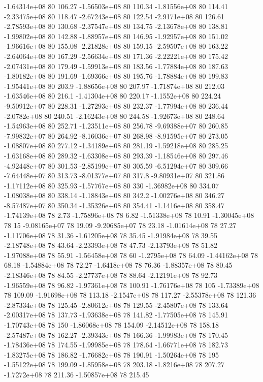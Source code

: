 -1.64314e+08 80 106.27
-1.56503e+08 80 110.34
-1.81556e+08 80 114.41
-2.33475e+08 80 118.47
-2.67243e+08 80 122.54
-2.9171e+08 80 126.61
-2.78593e+08 80 130.68
-2.37547e+08 80 134.75
-2.13678e+08 80 138.81
-1.99802e+08 80 142.88
-1.88957e+08 80 146.95
-1.92957e+08 80 151.02
-1.96616e+08 80 155.08
-2.21828e+08 80 159.15
-2.59507e+08 80 163.22
-2.64064e+08 80 167.29
-2.56634e+08 80 171.36
-2.22221e+08 80 175.42
-2.07431e+08 80 179.49
-1.59913e+08 80 183.56
-1.77884e+08 80 187.63
-1.80182e+08 80 191.69
-1.69366e+08 80 195.76
-1.78884e+08 80 199.83
-1.95441e+08 80 203.9
-1.88656e+08 80 207.97
-1.71874e+08 80 212.03
-1.63546e+08 80 216.1
-1.41304e+08 80 220.17
-1.1552e+08 80 224.24
-9.50912e+07 80 228.31
-1.27293e+08 80 232.37
-1.77994e+08 80 236.44
-2.0782e+08 80 240.51
-2.16243e+08 80 244.58
-1.92673e+08 80 248.64
-1.54963e+08 80 252.71
-1.23511e+08 80 256.78
-9.69388e+07 80 260.85
-7.99832e+07 80 264.92
-8.16036e+07 80 268.98
-8.91595e+07 80 273.05
-1.08807e+08 80 277.12
-1.34189e+08 80 281.19
-1.59218e+08 80 285.25
-1.63168e+08 80 289.32
-1.63308e+08 80 293.39
-1.18546e+08 80 297.46
-4.92448e+07 80 301.53
-2.85199e+07 80 305.59
-6.51294e+07 80 309.66
-7.64448e+07 80 313.73
-8.01377e+07 80 317.8
-9.80931e+07 80 321.86
-1.17112e+08 80 325.93
-1.57767e+08 80 330
-1.36982e+08 80 334.07
-1.08038e+08 80 338.14
-1.18843e+08 80 342.2
-1.00276e+08 80 346.27
-8.57487e+07 80 350.34
-1.35326e+08 80 354.41
-1.1416e+08 80 358.47
-1.74139e+08 78 2.73
-1.75896e+08 78 6.82
-1.51338e+08 78 10.91
-1.30045e+08 78 15
-9.08165e+07 78 19.09
-9.20685e+07 78 23.18
-1.01614e+08 78 27.27
-1.11706e+08 78 31.36
-1.61205e+08 78 35.45
-1.91984e+08 78 39.55
-2.18748e+08 78 43.64
-2.23393e+08 78 47.73
-2.13793e+08 78 51.82
-1.97088e+08 78 55.91
-1.56458e+08 78 60
-1.2795e+08 78 64.09
-1.44162e+08 78 68.18
-1.54884e+08 78 72.27
-1.6418e+08 78 76.36
-1.88357e+08 78 80.45
-2.18346e+08 78 84.55
-2.27737e+08 78 88.64
-2.12191e+08 78 92.73
-1.96559e+08 78 96.82
-1.97361e+08 78 100.91
-1.76176e+08 78 105
-1.73389e+08 78 109.09
-1.91698e+08 78 113.18
-2.1547e+08 78 117.27
-2.55378e+08 78 121.36
-2.87334e+08 78 125.45
-2.80612e+08 78 129.55
-2.45807e+08 78 133.64
-2.00317e+08 78 137.73
-1.93638e+08 78 141.82
-1.77505e+08 78 145.91
-1.70743e+08 78 150
-1.86068e+08 78 154.09
-2.14512e+08 78 158.18
-2.57487e+08 78 162.27
-2.39343e+08 78 166.36
-1.99983e+08 78 170.45
-1.78436e+08 78 174.55
-1.99985e+08 78 178.64
-1.66771e+08 78 182.73
-1.83275e+08 78 186.82
-1.76682e+08 78 190.91
-1.50264e+08 78 195
-1.55122e+08 78 199.09
-1.85958e+08 78 203.18
-1.8216e+08 78 207.27
-1.7272e+08 78 211.36
-1.50857e+08 78 215.45
